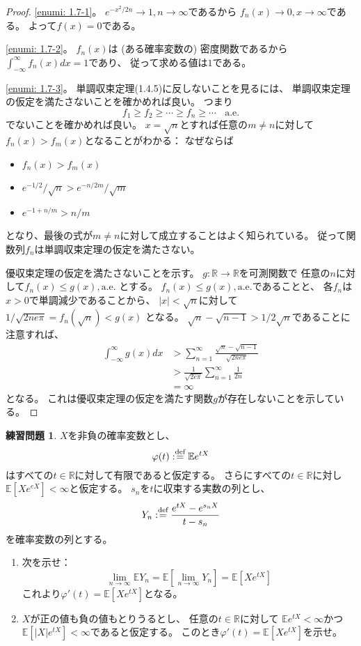 \documentclass[uplatex]{jsarticle}
\theoremstyle{definition}
\newtheorem{prob}[prob]{練習問題}
\def\R{\mathbb{R}}
\def\E{\mathbb{E}}
\def\dfn{:\overset{\mbox{{\scriptsize def}}}{=}}
\renewcommand{\ae}{\text{a.e.}}
\begin{document}
\begin{proof}
  \ref{enumi: 1.7-1}。
  \(e^{-x^2/2n} \to 1 , n\to \infty\)であるから
  \(f_n(x) \to 0 , x\to \infty\)である。
  よって\(f(x)=0\)である。

  \ref{enumi: 1.7-2}。
  \(f_n(x)\)は (ある確率変数の) 密度関数であるから
  \(\int_{-\infty}^{\infty}f_n(x)dx = 1\)であり、
  従って求める値は\(1\)である。

  \ref{enumi: 1.7-3}。
  単調収束定理(1.4.5)に反しないことを見るには、
  単調収束定理の仮定を満たさないことを確かめれば良い。
  つまり
  \[
  f_1 \geq f_2 \geq \cdots \geq f_n \geq \cdots \ \ \ \ \ae
  \]
  でないことを確かめれば良い。
  \(x = \sqrt{n}\)とすれば任意の\(m\neq n\)に対して
  \(f_n(x) > f_m(x)\)となることがわかる：
  なぜならば
  \begin{itemize}
    \item[ \ ] \(f_n(x) > f_m(x)\)
    \item[\(\iff\)] \(e^{-1/2}/\sqrt{n} > e^{-n/2m}/\sqrt{m}\)
    \item[\(\iff\)] \(e^{-1+n/m} > n/m\)
  \end{itemize}
  となり、最後の式が\(m\neq n\)に対して成立することはよく知られている。
  従って関数列\(f_n\)は単調収束定理の仮定を満たさない。

  優収束定理の仮定を満たさないことを示す。
  \(g:\R\to \R\)を可測関数で
  任意の\(n\)に対して\(f_n(x) \leq g(x) , \ae\)
  とする。
  \(f_n(x) \leq g(x) , \ae\)であることと、
  各\(f_n\)は\(x>0\)で単調減少であることから、
  \(|x| < \sqrt{n}\)に対して
  \(1/\sqrt{2ne\pi} = f_n(\sqrt{n}) < g(x)\)
  となる。
  \(\sqrt{n}-\sqrt{n-1} > 1/2\sqrt{n}\)であることに注意すれば、
  \begin{align*}
    \int_{-\infty}^{\infty}g(x)dx
    &> \sum_{n=1}^{\infty}\frac{\sqrt{n}-\sqrt{n-1}}{\sqrt{2ne\pi}} \\
    &> \frac{1}{\sqrt{2e\pi}}\sum_{n=1}^{\infty}\frac{1}{2n} \\
    &= \infty
  \end{align*}
  となる。
  これは優収束定理の仮定を満たす関数\(g\)が存在しないことを示している。
\end{proof}




\begin{prob}\label{prob: 1.8}
  \(X\)を非負の確率変数とし、
  \[
  \varphi(t) \dfn \E e^{tX}
  \]
  はすべての\(t\in \R\)に対して有限であると仮定する。
  さらにすべての\(t\in \R\)に対し
  \(\E[Xe^{eX}] < \infty\)と仮定する。
  \(s_n\)を\(t\)に収束する実数の列とし、
  \[
  Y_n \dfn \frac{e^{tX}-e^{s_nX}}{t-s_n}
  \]
  を確率変数の列とする。
  \begin{enumerate}
    \item \label{enumi: 1.8-1}
    次を示せ：
    \[
    \lim_{n\to \infty}\E Y_n = \E[\lim_{n\to \infty}Y_n] = \E[Xe^{tX}]
    \]
    これより\(\varphi'(t) = \E[Xe^{tX}]\)となる。
    \item \label{enumi: 1.8-2}
    \(X\)が正の値も負の値もとりうるとし、
    任意の\(t\in \R\)に対して
    \(\E e^{tX} < \infty\)かつ
    \(\E [|X|e^{tX}] < \infty\)であると仮定する。
    このとき\(\varphi'(t) = \E[Xe^{tX}]\)を示せ。
  \end{enumerate}
\end{prob}
\end{document}
